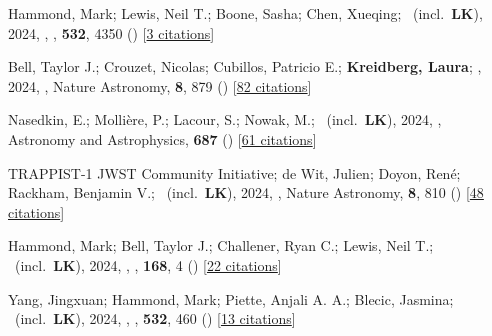 \item[{\color{numcolor}\scriptsize117}] Hammond, Mark; Lewis, Neil T.; Boone, Sasha; Chen, Xueqing; \etal\ (incl.\ \textbf{LK}), 2024, , \mnras, \textbf{532}, 4350 () [\href{https://ui.adsabs.harvard.edu/abs/2024MNRAS.532.4350H}{3 citations}]

\item[{\color{numcolor}\scriptsize116}] Bell, Taylor J.; Crouzet, Nicolas; Cubillos, Patricio E.; \textbf{Kreidberg, Laura}; \etal, 2024, , Nature Astronomy, \textbf{8}, 879 () [\href{https://ui.adsabs.harvard.edu/abs/2024NatAs...8..879B}{82 citations}]

\item[{\color{numcolor}\scriptsize115}] Nasedkin, E.; Molli{\`e}re, P.; Lacour, S.; Nowak, M.; \etal\ (incl.\ \textbf{LK}), 2024, , Astronomy and Astrophysics, \textbf{687} () [\href{https://ui.adsabs.harvard.edu/abs/2024A&A...687A.298N}{61 citations}]

\item[{\color{numcolor}\scriptsize114}] TRAPPIST-1 JWST Community Initiative; de Wit, Julien; Doyon, Ren{\'e}; Rackham, Benjamin V.; \etal\ (incl.\ \textbf{LK}), 2024, , Nature Astronomy, \textbf{8}, 810 () [\href{https://ui.adsabs.harvard.edu/abs/2024NatAs...8..810T}{48 citations}]

\item[{\color{numcolor}\scriptsize113}] Hammond, Mark; Bell, Taylor J.; Challener, Ryan C.; Lewis, Neil T.; \etal\ (incl.\ \textbf{LK}), 2024, , \aj, \textbf{168}, 4 () [\href{https://ui.adsabs.harvard.edu/abs/2024AJ....168....4H}{22 citations}]

\item[{\color{numcolor}\scriptsize112}] Yang, Jingxuan; Hammond, Mark; Piette, Anjali A. A.; Blecic, Jasmina; \etal\ (incl.\ \textbf{LK}), 2024, , \mnras, \textbf{532}, 460 () [\href{https://ui.adsabs.harvard.edu/abs/2024MNRAS.532..460Y}{13 citations}]

